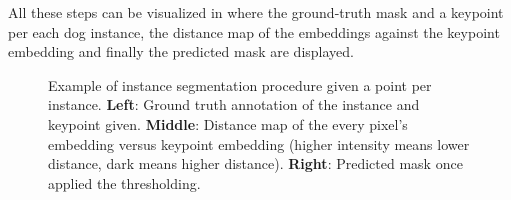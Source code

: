 All these steps can be visualized in  where the ground-truth mask and a keypoint per each dog instance, the distance map of the embeddings against the keypoint embedding and finally the predicted mask are displayed.

\begin{figure}[h]
  \centering
  \caption{Example of instance segmentation procedure given a point per instance.
  \textbf{Left}: Ground truth annotation of the instance and keypoint given.
  \textbf{Middle}: Distance map of the every pixel's embedding versus keypoint embedding (higher intensity means lower distance, dark means higher distance).
  \textbf{Right}: Predicted mask once applied the thresholding. }
  \label{fig:instancesegmentation}
\end{figure}
